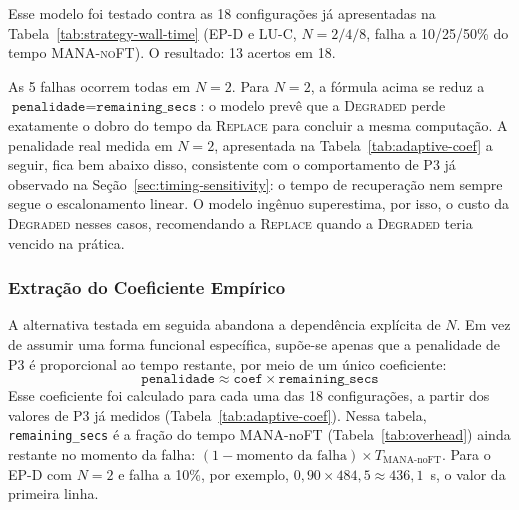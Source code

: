 Esse modelo foi testado contra as 18 configurações já apresentadas na
Tabela~\ref{tab:strategy-wall-time} (\textsc{EP-D} e \textsc{LU-C}, $N=2/4/8$, falha a
10/25/50\% do tempo \textsc{MANA-noFT}). O resultado: 13 acertos em 18.

As 5 falhas ocorrem todas em $N=2$. Para $N=2$, a fórmula acima se reduz a
$\texttt{penalidade} = \texttt{remaining\_secs}$: o modelo prevê que a
\textsc{Degraded} perde exatamente o dobro do tempo da \textsc{Replace} para concluir
a mesma computação. A penalidade real medida em $N=2$, apresentada na
Tabela~\ref{tab:adaptive-coef} a seguir, fica bem abaixo disso, consistente com o
comportamento de P3 já observado na Seção~\ref{sec:timing-sensitivity}: o tempo de
recuperação nem sempre segue o escalonamento linear. O modelo ingênuo superestima,
por isso, o custo da \textsc{Degraded} nesses casos, recomendando a \textsc{Replace}
quando a \textsc{Degraded} teria vencido na prática.

\subsubsection{Extração do Coeficiente Empírico}

A alternativa testada em seguida abandona a dependência explícita de $N$. Em vez de
assumir uma forma funcional específica, supõe-se apenas que a penalidade de P3 é
proporcional ao tempo restante, por meio de um único coeficiente:
\[
\texttt{penalidade} \approx \texttt{coef} \times \texttt{remaining\_secs}
\]
Esse coeficiente foi calculado para cada uma das 18 configurações, a partir dos
valores de P3 já medidos (Tabela~\ref{tab:adaptive-coef}). Nessa tabela,
\texttt{remaining\_secs} é a fração do tempo MANA-noFT (Tabela~\ref{tab:overhead})
ainda restante no momento da falha: $(1 - \text{momento da falha}) \times
T_{\text{MANA-noFT}}$. Para o EP-D com $N=2$ e falha a 10\%, por exemplo,
$0,90 \times 484,5 \approx 436,1$~s, o valor da primeira linha.

